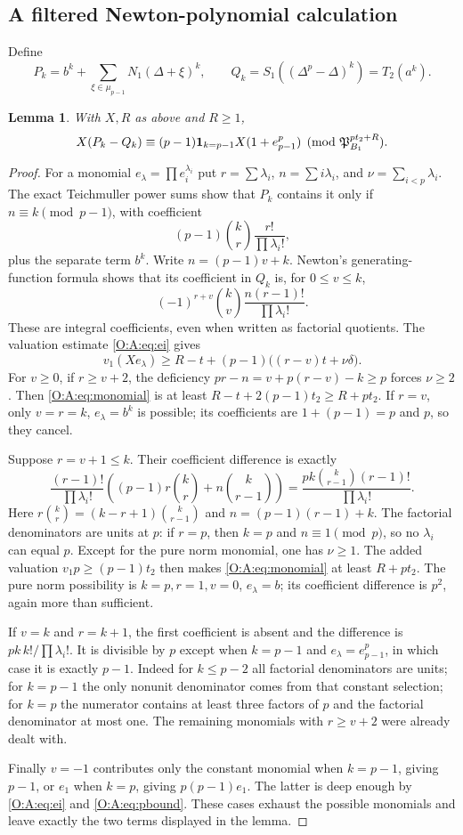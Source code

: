 \documentclass[11pt]{amsart}
\newtheorem{lemma}[theorem]{Lemma}
\theoremstyle{definition}
\theoremstyle{remark}
\begin{document}
\subsection{A filtered Newton-polynomial calculation}
Define
\[
 P_k=b^k+\sum_{\xi\in\mu_{p-1}}N_1(\Delta+\xi)^k,
 \qquad Q_k=S_1((\Delta^p-\Delta)^k)=T_2(a^k).
\]
\begin{lemma}\label{O:A:lem:filtered}
With $X,R$ as above and $R\ge1$,
\[
 X(P_k-Q_k)\equiv(p-1)\mathbf1_{k=p-1}X(1+e_{p-1}^p)
       \pmod{\mathfrak P_{B_1}^{pt_2+R}}.
\]
\end{lemma}
\begin{proof}
For a monomial $e_\lambda=\prod e_i^{\lambda_i}$ put
$r=\sum\lambda_i$, $n=\sum i\lambda_i$, and $\nu=\sum_{i<p}\lambda_i$.
The exact Teichmuller power sums show that $P_k$ contains it only if
$n\equiv k\pmod{p-1}$, with coefficient
\[
 (p-1)\binom kr\frac{r!}{\prod\lambda_i!},
\]
plus the separate term $b^k$.  Write $n=(p-1)v+k$.
Newton's generating-function formula shows that its coefficient in $Q_k$
is, for $0\le v\le k$,
\[
 (-1)^{r+v}\binom kv\frac{n(r-1)!}{\prod\lambda_i!}.
\]
These are integral coefficients, even when written as factorial quotients.
The valuation estimate \eqref{O:A:eq:ei} gives
\begin{equation}
 v_1(Xe_\lambda)\ge R-t+(p-1)\bigl((r-v)t+\nu\delta\bigr).
 \label{O:A:eq:monomial}
\end{equation}
For $v\ge0$, if $r\ge v+2$, the deficiency
$pr-n=v+p(r-v)-k\ge p$ forces $\nu\ge2$.
Then \eqref{O:A:eq:monomial} is at least
$R-t+2(p-1)t_2\ge R+pt_2$.
If $r=v$, only $v=r=k$, $e_\lambda=b^k$ is possible; its coefficients
are $1+(p-1)=p$ and $p$, so they cancel.

Suppose $r=v+1\le k$.  Their coefficient difference is exactly
\[
 \frac{(r-1)!}{\prod\lambda_i!}
 \left((p-1)r\binom kr+n\binom k{r-1}\right)
 =\frac{pk\binom k{r-1}(r-1)!}{\prod\lambda_i!}.
\]
Here $r\binom kr=(k-r+1)\binom k{r-1}$ and
$n=(p-1)(r-1)+k$.  The factorial denominators are units at $p$:
if $r=p$, then $k=p$ and $n\equiv1\pmod p$, so no $\lambda_i$ can equal $p$.
Except for the pure norm monomial, one has $\nu\ge1$.
The added valuation $v_1p\ge(p-1)t_2$ then makes
\eqref{O:A:eq:monomial} at least $R+pt_2$.
The pure norm possibility is $k=p,r=1,v=0$, $e_\lambda=b$;
its coefficient difference is $p^2$, again more than sufficient.

If $v=k$ and $r=k+1$, the first coefficient is absent and the difference is
$pk\,k!/\prod\lambda_i!$.
It is divisible by $p$ except when $k=p-1$ and
$e_\lambda=e_{p-1}^p$, in which case it is exactly $p-1$.
Indeed for $k\le p-2$ all factorial denominators are units;
for $k=p-1$ the only nonunit denominator comes from that constant selection;
for $k=p$ the numerator contains at least three factors of $p$ and the
factorial denominator at most one.
The remaining monomials with $r\ge v+2$ were already dealt with.

Finally $v=-1$ contributes only the constant monomial when $k=p-1$, giving
$p-1$, or $e_1$ when $k=p$, giving $p(p-1)e_1$.
The latter is deep enough by \eqref{O:A:eq:ei} and \eqref{O:A:eq:pbound}.
These cases exhaust the possible monomials and leave exactly the two
terms displayed in the lemma.
\end{proof}
\end{document}
